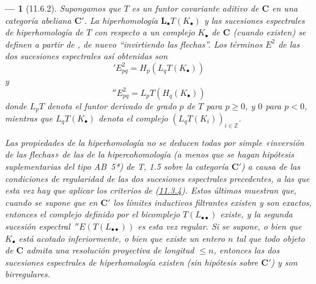 \documentclass[10pt,oneside,openany]{book}
\theoremstyle{egaenv}\newtheorem*{env}{---}
\theoremstyle{egastatement}
\theoremstyle{egadescription}
\newcommand{\oldpage}[2][]{\marginnote{\normalfont\scriptsize\textbf{#1}\,|\,#2}\ignorespaces}
\renewcommand{\leq}{\leqslant}
\renewcommand{\geq}{\geqslant}
\begin{document}
\begin{env}[11.6.2]
\label{0.11.6.2}
\label{0.11.6.2-fr}
\oldpage[0\textsubscript{III}]{40}
Supongamos que $T$ es un \emph{funtor covariante aditivo} de $\boldsymbol{C}$ en una categoría abeliana $\boldsymbol{C}'$.
La \emph{hiperhomología} $\mathbf{L}_\bullet T(K_\bullet)$ y las \emph{sucesiones espectrales de hiperhomología} de $T$ con respecto a un complejo $K_\bullet$ de $\boldsymbol{C}$ (cuando existen) se definen a partir de , de nuevo ``invirtiendo las flechas''.
Los términos $E^2$ de las dos sucesiones espectrales así obtenidas son
\[
\label{0.11.6.2.1-fr}
\tag{11.6.2.1}
{}'E^2_{pq}=H_p(L_qT(K_\bullet))
\]
y
\[
\label{0.11.6.2.2-fr}
\tag{11.6.2.2}
{}''E^2_{pq}=L_pT(H_q(K_\bullet))
\]
donde $L_pT$ denota el funtor derivado de grado $p$ de $T$ para $p\geq 0$, y $0$ para $p<0$, mientras que $L_qT(K_\bullet)$ denota el complejo $(L_qT(K_i))_{i\in\mathbb Z}$.

Las propiedades de la hiperhomología no se deducen todas por simple «inversión de las flechas» de las de la hipercohomología (a menos que se hagan hipótesis suplementarias del tipo AB~5*) de T, 1.5 sobre la categoría $\boldsymbol{C}'$) a causa de las condiciones de \emph{regularidad} de las dos sucesiones espectrales precedentes, a las que esta vez hay que aplicar los criterios de (\hyperref[0.11.3.4-fr]{11.3.4}). Estos últimos muestran que, cuando se supone que en $\boldsymbol{C}'$ los límites inductivos filtrantes existen y son exactos, entonces el complejo definido por el bicomplejo $T(L_{\bullet\bullet})$ existe, y la \emph{segunda} sucesión espectral $\,{}''E(T(L_{\bullet\bullet}))$ es esta vez \emph{regular}. Si se supone, o bien que $K_\bullet$ está acotado inferiormente, o bien que existe un entero $n$ tal que todo objeto de $\boldsymbol{C}$ admita una resolución proyectiva de longitud $\leq n$, entonces las \emph{dos} sucesiones espectrales de hiperhomología existen (sin hipótesis sobre $\boldsymbol{C}'$) y son \emph{birregulares}.
\end{env}
\end{document}
